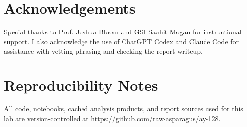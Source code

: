 \documentclass[10pt,preprint2]{aastex}
\begin{document}
\section*{Acknowledgements}
Special thanks to Prof. Joshua Bloom and GSI Saahit Mogan for instructional support.
I also acknowledge the use of ChatGPT Codex and Claude Code for assistance
with vetting phrasing and checking the report writeup.




\appendix

\section{Reproducibility Notes}

All code, notebooks, cached analysis products, and report sources used for this lab are version-controlled at \url{https://github.com/raw-asparagus/ay-128}.

% 
\end{document}
